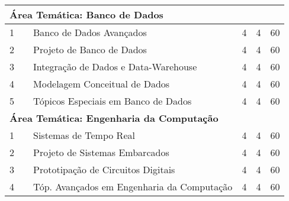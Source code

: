 \documentclass[
	12pt,				%
	openright,			%
  oneside,     %
	a4paper,			%
	english,			%
	french,				%
	spanish,			%
	brazil				%
	]{abntex2}
\begin{document}
\begin{apendicesenv}
\begin{longtable}{r|r|l|r|r|r}
\multicolumn{6}{l}{\textbf{Área Temática: Banco de Dados} } \\ \hline
    1     &       & Banco de Dados Avançados & 4     & 4     & 60 \\ \hline
    2     &       & Projeto de Banco de Dados & 4     & 4     & 60 \\ \hline
    3     &       & Integração de Dados e Data-Warehouse & 4     & 4     & 60 \\ \hline
    4     &       & Modelagem Conceitual de Dados & 4     & 4     & 60 \\ \hline
    5     &       & Tópicos Especiais em Banco de Dados & 4     & 4     & 60 \\ \hline

\multicolumn{6}{l}{\textbf{Área Temática: Engenharia da Computação}}\\ \hline
    1     &       & Sistemas de Tempo Real & 4     & 4     & 60 \\ \hline
    2     &       & Projeto de Sistemas Embarcados & 4     & 4     & 60 \\ \hline
    3     &       & Prototipação de Circuitos Digitais & 4     & 4     & 60 \\ \hline
    4     &       & \small{Tóp. Avançados em Engenharia da Computação} & 4     & 4     & 60 \\ \hline


\end{longtable}
\end{apendicesenv}
\end{document}

